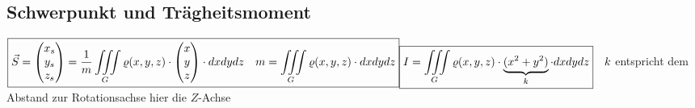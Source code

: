 \subsection{Schwerpunkt und Trägheitsmoment }
$\boxed{\vec{S}=\begin{pmatrix}
	x_s\\
	y_s\\
	z_s                                            
\end{pmatrix}=\frac{1}{m}\iiint\limits_G \varrho(x,y,z) \cdot
\begin{pmatrix}
	x\\
	y\\
	z                                            
\end{pmatrix}\cdot dxdydz \quad m=\iiint\limits_G \varrho(x,y,z) \cdot
dxdydz}\\\boxed{I=\iiint\limits_G \varrho(x,y,z)\cdot
\underbrace{(x^2+y^2)}_{k}\cdot
dxdydz}\quad k$ entspricht dem Abstand zur Rotationsachse hier die $Z$-Achse




